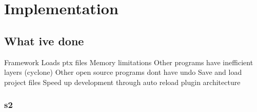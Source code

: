 \chapter{Implementation} \label{ch4}

\section{What ive done}

Framework
    Loads ptx files
    Memory limitations
    Other programs have inefficient layers (cyclone)
    Other open source programs dont have undo
    Save and load project files
    Speed up development through auto reload plugin architecture
    



\subsection{s2}